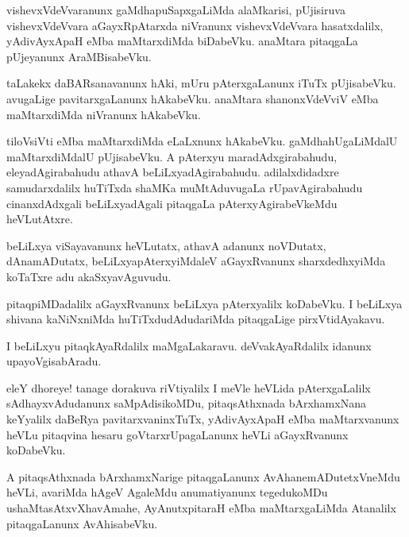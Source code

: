 \documentclass{article}
\begin{document}
\begin{mn}
vishevxVdeVvaranunx gaMdhapuSapxgaLiMda alaMkarisi, pUjisiruva
vishevxVdeVvara aGayxRpAtarxda niVranunx vishevxVdeVvara hasatxdalilx,
yAdivAyxApaH eMba maMtarxdiMda biDabeVku. anaMtara pitaqgaLa
pUjeyanunx AraMBisabeVku.
\end{mn}

\begin{mn}%
taLakekx daBARsanavanunx hAki, mUru pAterxgaLanunx iTuTx
pUjisabeVku. avugaLige pavitarxgaLanunx hAkabeVku. anaMtara
shanonxVdeVviV eMba maMtarxdiMda niVranunx hAkabeVku.
\end{mn}

\begin{mn}%
tiloVsiVti eMba maMtarxdiMda eLaLxnunx hAkabeVku. gaMdhahUgaLiMdalU
maMtarxdiMdalU pUjisabeVku. A pAterxyu maradAdxgirabahudu,
eleyadAgirabahudu athavA beLiLxyadAgirabahudu. adilalxdidadxre
samudarxdalilx huTiTxda shaMKa muMtAduvugaLa rUpavAgirabahudu
cinanxdAdxgali beLiLxyadAgali pitaqgaLa pAterxyAgirabeVkeMdu heVLutAtxre.
\end{mn}

\begin{mn}
beLiLxya viSayavanunx heVLutatx, athavA adanunx noVDutatx,
dAnamADutatx, beLiLxyapAterxyiMdaleV aGayxRvanunx sharxdedhxyiMda
koTaTxre adu akaSxyavAguvudu.
\end{mn}

\begin{mn}
pitaqpiMDadalilx aGayxRvanunx beLiLxya pAterxyalilx koDabeVku. I
beLiLxya shivana kaNiNxniMda huTiTxdudAdudariMda pitaqgaLige pirxVtidAyakavu.
\end{mn}

\begin{mn}%
I beLiLxyu pitaqkAyaRdalilx maMgaLakaravu. deVvakAyaRdalilx idanunx upayoVgisabAradu.
\end{mn}

\begin{mn}
eleY dhoreye! tanage dorakuva riVtiyalilx I meVle heVLida
pAterxgaLalilx sAdhayxvAdudanunx saMpAdisikoMDu, pitaqsAthxnada
bArxhamxNana keYyalilx daBeRya pavitarxvaninxTuTx, yAdivAyxApaH eMba
maMtarxvanunx heVLu pitaqvina hesaru goVtarxrUpagaLanunx heVLi
aGayxRvanunx koDabeVku.
\end{mn}

\begin{mn}
A pitaqsAthxnada bArxhamxNarige pitaqgaLanunx AvAhanemADutetxVneMdu
heVLi, avariMda hAgeV AgaleMdu anumatiyanunx tegedukoMDu
ushaMtasAtxvXhavAmahe, AyAnutxpitaraH eMba maMtarxgaLiMda Atanalilx
pitaqgaLanunx AvAhisabeVku.
\end{mn}
\end{document}
